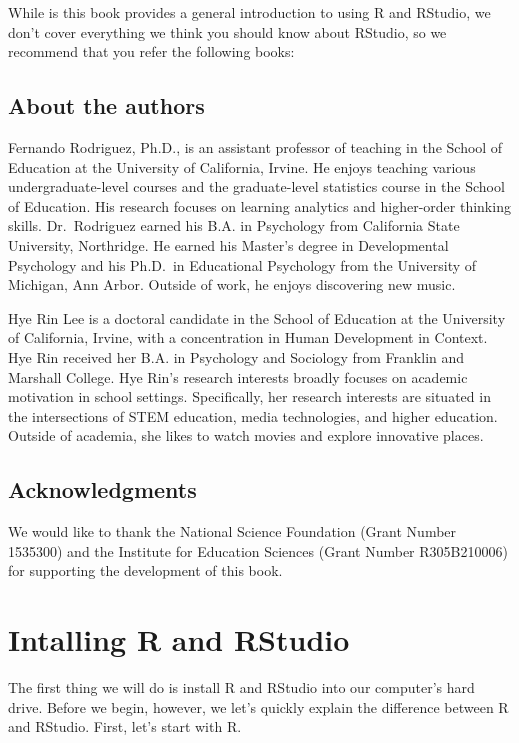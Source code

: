 \documentclass[
]{book}
\begin{document}
While is this book provides a general introduction to using R and RStudio, we don't cover everything we think you should know about RStudio, so we recommend that you refer the following books:

\hypertarget{about-the-authors}{%
\section{About the authors}\label{about-the-authors}}

Fernando Rodriguez, Ph.D., is an assistant professor of teaching in the School of Education at the University of California, Irvine. He enjoys teaching various undergraduate-level courses and the graduate-level statistics course in the School of Education. His research focuses on learning analytics and higher-order thinking skills. Dr.~Rodriguez earned his B.A. in Psychology from California State University, Northridge. He earned his Master's degree in Developmental Psychology and his Ph.D.~in Educational Psychology from the University of Michigan, Ann Arbor. Outside of work, he enjoys discovering new music.

Hye Rin Lee is a doctoral candidate in the School of Education at the University of California, Irvine, with a concentration in Human Development in Context. Hye Rin received her B.A. in Psychology and Sociology from Franklin and Marshall College. Hye Rin's research interests broadly focuses on academic motivation in school settings. Specifically, her research interests are situated in the intersections of STEM education, media technologies, and higher education. Outside of academia, she likes to watch movies and explore innovative places.

\hypertarget{acknowledgments}{%
\section{Acknowledgments}\label{acknowledgments}}

We would like to thank the National Science Foundation (Grant Number 1535300) and the Institute for Education Sciences (Grant Number R305B210006) for supporting the development of this book.

\hypertarget{intalling-r-and-rstudio}{%
\chapter{Intalling R and RStudio}\label{intalling-r-and-rstudio}}

The first thing we will do is install R and RStudio into our computer's hard drive. Before we begin, however, we let's quickly explain the difference between R and RStudio. First, let's start with R.
\end{document}
